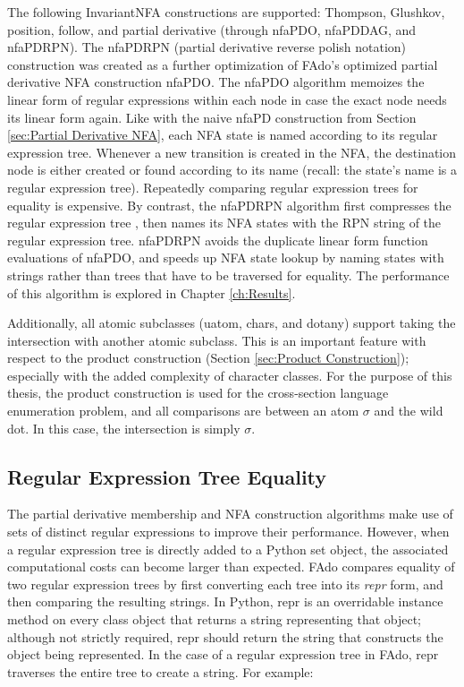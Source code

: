 The following InvariantNFA constructions are supported: Thompson, Glushkov, position, follow, and partial derivative (through nfaPDO, nfaPDDAG, and nfaPDRPN). The nfaPDRPN (partial derivative reverse polish notation) construction was created as a further optimization of FAdo's optimized partial derivative NFA construction nfaPDO. The nfaPDO algorithm memoizes the linear form of regular expressions within each node in case the exact node needs its linear form again. Like with the naive nfaPD construction from Section \ref{sec:Partial Derivative NFA}, each NFA state is named according to its regular expression tree. Whenever a new transition is created in the NFA, the destination node is either created or found according to its name (recall: the state's name is a regular expression tree). Repeatedly comparing regular expression trees for equality is expensive. By contrast, the nfaPDRPN algorithm first compresses the regular expression tree \cite{pddag}, then names its NFA states with the RPN string of the regular expression tree. nfaPDRPN avoids the duplicate linear form function evaluations of nfaPDO, and speeds up NFA state lookup by naming states with strings rather than trees that have to be traversed for equality. The performance of this algorithm is explored in Chapter \ref{ch:Results}.

Additionally, all atomic subclasses (uatom, chars, and dotany) support taking the intersection with another atomic subclass. This is an important feature with respect to the product construction (Section \ref{sec:Product Construction}); especially with the added complexity of character classes. For the purpose of this thesis, the product construction is used for the cross-section language enumeration problem, and all comparisons are between an atom $\sigma$ and the wild dot. In this case, the intersection is simply $\sigma$.


\subsection{Regular Expression Tree Equality}
\label{subsec:Regular Expression Tree Equality}
The partial derivative membership and NFA construction algorithms make use of sets of distinct regular expressions to improve their performance. However, when a regular expression tree is directly added to a Python set object, the associated computational costs can become larger than expected. FAdo compares equality of two regular expression trees by first converting each tree into its \emph{repr} form, and then comparing the resulting strings. In Python, repr is an overridable instance method on every class object that returns a string representing that object; although not strictly required, repr should return the string that constructs the object being represented. In the case of a regular expression tree in FAdo, repr traverses the entire tree to create a string. For example:

